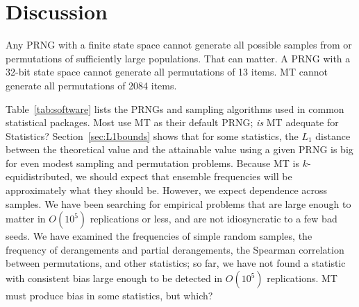 \documentclass[graybox]{svmult}
\renewcommand{\arraystretch}{1}
\begin{document}
\section{Discussion}
\label{sec:discussion}

Any PRNG with a finite state space cannot generate all possible samples from or permutations of 
sufficiently large populations.
That can matter.
A PRNG with a 32-bit state space cannot generate all permutations of 13 items.
MT cannot generate all permutations of 2084 items.

Table~\ref{tab:software} lists the PRNGs and sampling algorithms used in common statistical packages.
Most use MT as their default PRNG; \emph{is} MT adequate for Statistics?
Section~\ref{sec:L1bounds} shows that for some statistics, the $L_1$ distance between the theoretical value and the attainable value using a given PRNG
 is big for even modest sampling and permutation problems.
Because MT is $k$-equidistributed, we should expect that ensemble frequencies will be approximately
what they should be.
However, we expect dependence across samples.
We have been searching for empirical problems that are large enough to matter in 
$O(10^5)$ replications or less, and are not idiosyncratic to a few bad seeds.
We have examined the frequencies of simple random samples, the frequency of derangements and partial derangements, the Spearman correlation between permutations, 
and other statistics; so far, we have not found a statistic with consistent
bias large enough to be detected in $O(10^5)$ replications.
MT must produce bias in some statistics, but which?

\renewcommand{\arraystretch}{1}
\end{document}
